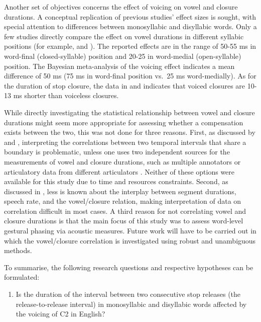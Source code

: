 \documentclass[12pt,a4paper,]{article}
\providecommand{\tightlist}{%
  \setlength{\itemsep}{0pt}\setlength{\parskip}{0pt}}
\begin{document}
Another set of objectives concerns the effect of voicing on vowel and
closure durations. A conceptual replication of previous studies' effect
sizes is sought, with special attention to differences between
monosyllabic and disyllabic words. Only a few studies directly compare
the effect on vowel durations in different syllabic positions (for
example, \citet{sharf1962} and \citet{klatt1973}). The reported effects
are in the range of 50-55 ms in word-final (closed-syllable) position
and 20-25 in word-medial (open-syllable) position. The Bayesian
meta-analysis of the voicing effect indicates a mean difference of 50 ms
(75 ms in word-final position vs.~25 ms word-medially). As for the
duration of stop closure, the data in \citet{sharf1962} and
\citet{luce1985} indicates that voiced closures are 10-13 ms shorter
than voiceless closures.

While directly investigating the statistical relationship between vowel
and closure durations might seem more appropriate for assessing whether
a compensation exists between the two, this was not done for three
reasons. First, as discussed by \citet{ohala1976} and \citet{begus2017},
interpreting the correlations between two temporal intervals that share
a boundary is problematic, unless one uses two independent sources for
the measurements of vowel and closure durations, such as multiple
annotators \citep{begus2017} or articulatory data from different
articulators \citep{de-jong1991}. Neither of these options were
available for this study due to time and resources constraints. Second,
as discussed in \citet{coretta2019k}, less is known about the interplay
between segment durations, speech rate, and the vowel/closure relation,
making interpretation of data on correlation difficult in most cases. A
third reason for not correlating vowel and closure durations is that the
main focus of this study was to assess word-level gestural phasing via
acoustic measures. Future work will have to be carried out in which the
vowel/closure correlation is investigated using robust and unambiguous
methods.

To summarise, the following research questions and respective hypotheses
can be formulated:

\begin{enumerate}
\def\labelenumi{\arabic{enumi}.}
\tightlist
\item
  Is the duration of the interval between two consecutive stop releases
  (the release-to-release interval) in monosyllabic and disyllabic words
  affected by the voicing of C2 in English?
\end{enumerate}
\end{document}
